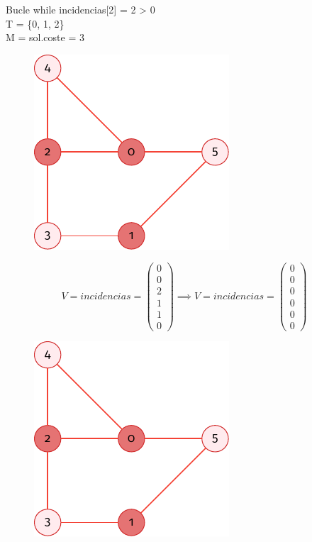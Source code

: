 \documentclass[spanish]{beamer}
\begin{document}
\begin{frame}{Bucle while}
	incidencias[2] = 2 > 0\\
	T = \{0, 1, 2\}\\
	M = sol.coste = 3
	\begin{figure}[H]
		\centering \includegraphics{./img/grafo-ejemplo.pdf}
	\end{figure}
\end{frame}

\begin{frame}{}
	$$  V = incidencias =
	\begin{pmatrix}
	  0 \\
	  0 \\
	  2 \\
	  1 \\
	  1 \\
	  0
	\end{pmatrix} \implies  V = incidencias =
	\begin{pmatrix}
	  0 \\
	  0 \\
	  0 \\
	  0 \\
	  0 \\
	  0
	\end{pmatrix}$$
	\begin{figure}[H]
		\centering \includegraphics{./img/grafo-ejemplo.pdf}
	\end{figure}
\end{frame}
\end{document}
